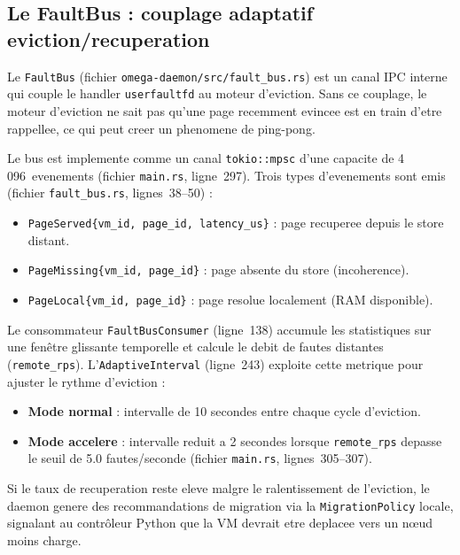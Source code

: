 \subsection{Le FaultBus : couplage adaptatif eviction/recuperation}
\label{subsec:faultbus}

Le \texttt{FaultBus} (fichier \texttt{omega-daemon/src/fault\_bus.rs}) est un canal IPC interne qui couple le handler \texttt{userfaultfd} au moteur d'eviction. Sans ce couplage, le moteur d'eviction ne sait pas qu'une page recemment evincee est en train d'etre rappellee, ce qui peut creer un phenomene de ping-pong.

Le bus est implemente comme un canal \texttt{tokio::mpsc} d'une capacite de 4\,096~evenements (fichier \texttt{main.rs}, ligne~297). Trois types d'evenements sont emis (fichier \texttt{fault\_bus.rs}, lignes~38--50) :

\begin{itemize}
    \item \texttt{PageServed\{vm\_id, page\_id, latency\_us\}} : page recuperee depuis le store distant.
    \item \texttt{PageMissing\{vm\_id, page\_id\}} : page absente du store (incoherence).
    \item \texttt{PageLocal\{vm\_id, page\_id\}} : page resolue localement (RAM disponible).
\end{itemize}

Le consommateur \texttt{FaultBusConsumer} (ligne~138) accumule les statistiques sur une fen\^etre glissante temporelle et calcule le debit de fautes distantes (\texttt{remote\_rps}). L'\texttt{AdaptiveInterval} (ligne~243) exploite cette metrique pour ajuster le rythme d'eviction :

\begin{itemize}
    \item \textbf{Mode normal} : intervalle de 10 secondes entre chaque cycle d'eviction.
    \item \textbf{Mode accelere} : intervalle reduit a 2 secondes lorsque \texttt{remote\_rps} depasse le seuil de 5.0 fautes/seconde (fichier \texttt{main.rs}, lignes~305--307).
\end{itemize}

Si le taux de recuperation reste eleve malgre le ralentissement de l'eviction, le daemon genere des recommandations de migration via la \texttt{MigrationPolicy} locale, signalant au contrôleur Python que la VM devrait etre deplacee vers un nœud moins charge.

